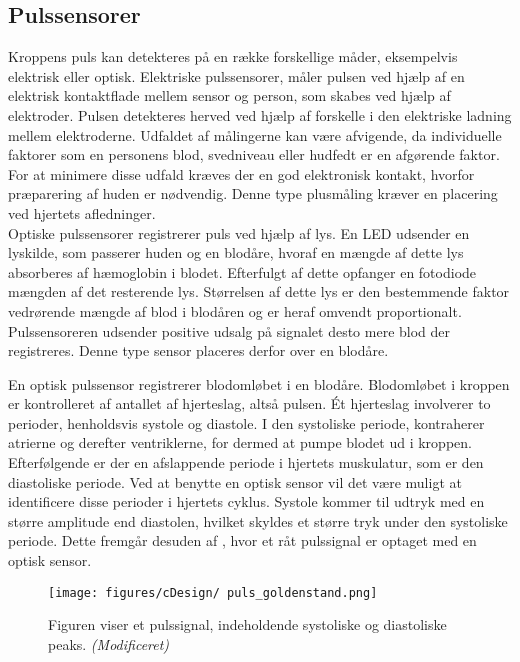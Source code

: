 \subsection{Pulssensorer}\label{sec:pulssensor}
Kroppens puls kan detekteres på en række forskellige måder, eksempelvis elektrisk eller optisk. Elektriske pulssensorer, måler pulsen ved hjælp af en elektrisk kontaktflade mellem sensor og person, som skabes ved hjælp af elektroder. Pulsen detekteres herved ved hjælp af forskelle i den elektriske ladning mellem elektroderne. Udfaldet af målingerne kan være afvigende, da individuelle faktorer som en personens blod, svedniveau eller hudfedt er en afgørende faktor. For at minimere disse udfald kræves der en god elektronisk kontakt, hvorfor præparering af huden er nødvendig. Denne type plusmåling kræver en placering ved hjertets afledninger. \citep{PhuaLissorguesMercier2009}  \\
Optiske pulssensorer registrerer puls ved hjælp af lys. En LED udsender en lyskilde, som passerer huden og en blodåre, hvoraf en mængde af dette lys absorberes af hæmoglobin i blodet. Efterfulgt af dette opfanger en fotodiode mængden af det resterende lys. Størrelsen af dette lys er den bestemmende faktor vedrørende mængde af blod i blodåren og er heraf omvendt proportionalt. Pulssensoreren udsender positive udsalg på signalet desto mere blod der registreres. Denne type sensor placeres derfor over en blodåre. \citep{PhuaLissorguesMercier2009,SrinivasReddySrinivas2006} 

En optisk pulssensor registrerer blodomløbet i en blodåre. Blodomløbet i kroppen er kontrolleret af antallet af hjerteslag, altså pulsen. Ét hjerteslag involverer to perioder, henholdsvis systole og diastole. I den systoliske periode, kontraherer atrierne og derefter ventriklerne, for dermed at pumpe blodet ud i kroppen. Efterfølgende er der en afslappende periode i hjertets muskulatur, som er den diastoliske periode. \newline
Ved at benytte en optisk sensor vil det være muligt at identificere disse perioder i hjertets cyklus. Systole kommer til udtryk med en større amplitude end diastolen, hvilket skyldes et større tryk under den systoliske periode. Dette fremgår desuden af , hvor et råt pulssignal er optaget med en optisk sensor. \citep{Martini2012}

\begin{figure}[H]
	\centering
	\texttt{[image: figures/cDesign/ puls\_goldenstand.png]}
	\caption{Figuren viser et pulssignal, indeholdende systoliske og diastoliske peaks. \citep{GanZahedi2011} \textit{(Modificeret)}}
	\label{fig:puls_goldenstand}
\end{figure}

